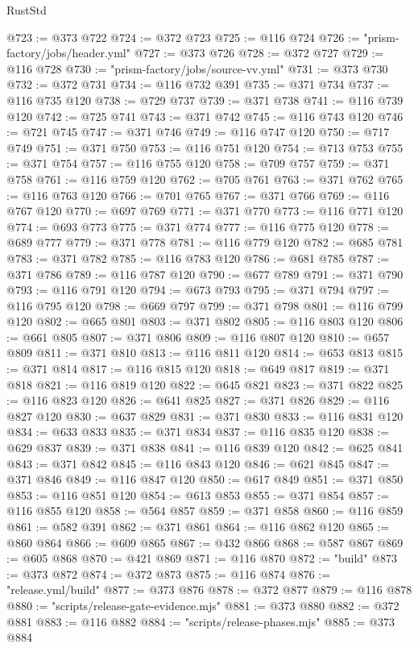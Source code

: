 \begin{lexlean}{RustStd}
\begin{coremodule}
@723 := @373 @722
@724 := @372 @723
@725 := @116 @724
@726 := "prism-factory/jobs/header.yml"
@727 := @373 @726
@728 := @372 @727
@729 := @116 @728
@730 := "prism-factory/jobs/source-vv.yml"
@731 := @373 @730
@732 := @372 @731
@734 := @116 @732 @391
@735 := @371 @734
@737 := @116 @735 @120
@738 := @729 @737
@739 := @371 @738
@741 := @116 @739 @120
@742 := @725 @741
@743 := @371 @742
@745 := @116 @743 @120
@746 := @721 @745
@747 := @371 @746
@749 := @116 @747 @120
@750 := @717 @749
@751 := @371 @750
@753 := @116 @751 @120
@754 := @713 @753
@755 := @371 @754
@757 := @116 @755 @120
@758 := @709 @757
@759 := @371 @758
@761 := @116 @759 @120
@762 := @705 @761
@763 := @371 @762
@765 := @116 @763 @120
@766 := @701 @765
@767 := @371 @766
@769 := @116 @767 @120
@770 := @697 @769
@771 := @371 @770
@773 := @116 @771 @120
@774 := @693 @773
@775 := @371 @774
@777 := @116 @775 @120
@778 := @689 @777
@779 := @371 @778
@781 := @116 @779 @120
@782 := @685 @781
@783 := @371 @782
@785 := @116 @783 @120
@786 := @681 @785
@787 := @371 @786
@789 := @116 @787 @120
@790 := @677 @789
@791 := @371 @790
@793 := @116 @791 @120
@794 := @673 @793
@795 := @371 @794
@797 := @116 @795 @120
@798 := @669 @797
@799 := @371 @798
@801 := @116 @799 @120
@802 := @665 @801
@803 := @371 @802
@805 := @116 @803 @120
@806 := @661 @805
@807 := @371 @806
@809 := @116 @807 @120
@810 := @657 @809
@811 := @371 @810
@813 := @116 @811 @120
@814 := @653 @813
@815 := @371 @814
@817 := @116 @815 @120
@818 := @649 @817
@819 := @371 @818
@821 := @116 @819 @120
@822 := @645 @821
@823 := @371 @822
@825 := @116 @823 @120
@826 := @641 @825
@827 := @371 @826
@829 := @116 @827 @120
@830 := @637 @829
@831 := @371 @830
@833 := @116 @831 @120
@834 := @633 @833
@835 := @371 @834
@837 := @116 @835 @120
@838 := @629 @837
@839 := @371 @838
@841 := @116 @839 @120
@842 := @625 @841
@843 := @371 @842
@845 := @116 @843 @120
@846 := @621 @845
@847 := @371 @846
@849 := @116 @847 @120
@850 := @617 @849
@851 := @371 @850
@853 := @116 @851 @120
@854 := @613 @853
@855 := @371 @854
@857 := @116 @855 @120
@858 := @564 @857
@859 := @371 @858
@860 := @116 @859
@861 := @582 @391
@862 := @371 @861
@864 := @116 @862 @120
@865 := @860 @864
@866 := @609 @865
@867 := @432 @866
@868 := @587 @867
@869 := @605 @868
@870 := @421 @869
@871 := @116 @870
@872 := "build"
@873 := @373 @872
@874 := @372 @873
@875 := @116 @874
@876 := "release.yml/build"
@877 := @373 @876
@878 := @372 @877
@879 := @116 @878
@880 := "scripts/release-gate-evidence.mjs"
@881 := @373 @880
@882 := @372 @881
@883 := @116 @882
@884 := "scripts/release-phases.mjs"
@885 := @373 @884

\end{coremodule}
\end{lexlean}
